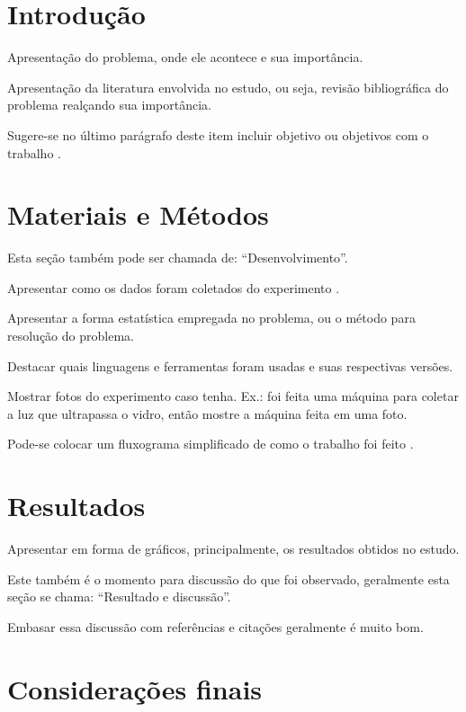 \documentclass{modelo_banner}
\begin{document}
	\construirtitulo

	\construirautores

	\begin{multicols}{2}	
		\section{Introdução}
		
		Apresentação do problema, onde ele acontece e sua importância.
		
		Apresentação da literatura envolvida no estudo, ou seja, revisão bibliográfica do problema realçando sua importância.
		
		Sugere-se no último parágrafo deste item incluir objetivo ou objetivos com o trabalho \cite{texbook}.
		
		\section{Materiais e Métodos}
		
		Esta seção também pode ser chamada de: ``Desenvolvimento''.
		
		Apresentar como os dados foram coletados do experimento \cite{knuth:1984}.
		
		Apresentar a forma estatística empregada no problema, ou o método para resolução do problema.
		
		Destacar quais linguagens e ferramentas foram usadas e suas respectivas versões.
		
		Mostrar fotos do experimento caso tenha. Ex.: foi feita uma máquina para coletar a luz que ultrapassa o vidro, então mostre a máquina feita em uma foto.
		
		Pode-se colocar um fluxograma simplificado de como o trabalho foi feito \cite{lesk:1977}.
		
		\section{Resultados}
		
		Apresentar em forma de gráficos, principalmente, os resultados obtidos no estudo.
		
		Este também é o momento para discussão do que foi observado, geralmente esta seção se chama: ``Resultado e discussão''.
		
		Embasar essa discussão com referências e citações geralmente é muito bom.
		
		\section{Considerações finais}
		

\end{multicols}
\end{document}

